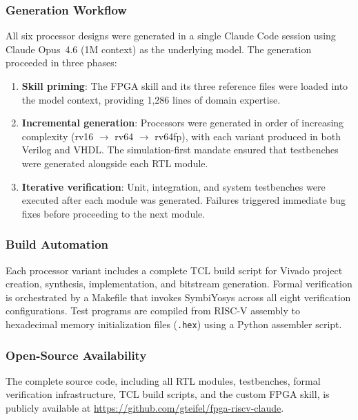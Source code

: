 \documentclass[journal]{IEEEtran}
\begin{document}
\subsubsection{Generation Workflow}
All six processor designs were generated in a single Claude Code session
using Claude Opus~4.6 (1M context) as the underlying model.  The
generation proceeded in three phases:
\begin{enumerate}[leftmargin=*]
\item \textbf{Skill priming}: The FPGA skill and its three reference
      files were loaded into the model context, providing 1,286 lines
      of domain expertise.
\item \textbf{Incremental generation}: Processors were generated in
      order of increasing complexity (rv16 $\rightarrow$ rv64 $\rightarrow$
      rv64fp), with each variant produced in both Verilog and VHDL.
      The simulation-first mandate ensured that testbenches were
      generated alongside each RTL module.
\item \textbf{Iterative verification}: Unit, integration, and system
      testbenches were executed after each module was generated.
      Failures triggered immediate bug fixes before proceeding to the
      next module.
\end{enumerate}

\subsubsection{Build Automation}
Each processor variant includes a complete TCL build script for Vivado
project creation, synthesis, implementation, and bitstream generation.
Formal verification is orchestrated by a Makefile that invokes
SymbiYosys across all eight verification configurations.  Test programs
are compiled from RISC-V assembly to hexadecimal memory initialization
files (\texttt{.hex}) using a Python assembler script.

\subsubsection{Open-Source Availability}
The complete source code, including all RTL modules, testbenches, formal
verification infrastructure, TCL build scripts, and the custom FPGA
skill, is publicly available at
\url{https://github.com/gteifel/fpga-riscv-claude}.


\end{document}
